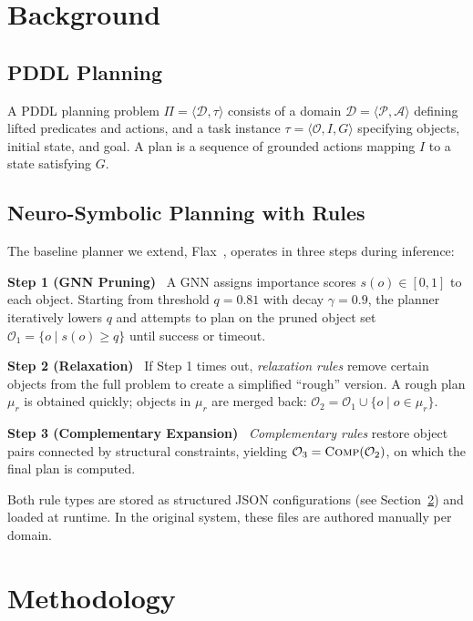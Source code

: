 \documentclass[letterpaper, 10pt, journal, twoside]{IEEEtran}
\newcommand{\sref}[1]{Section~\ref{#1}}
\newcommand{\myparagraph}[1]{\noindent\textbf{#1}~}
\begin{document}
\section{Background}
\label{sec:background}

\subsection{PDDL Planning}
A PDDL planning problem $\Pi = \langle \mathcal{D}, \tau \rangle$ consists of a domain $\mathcal{D} = \langle \mathcal{P}, \mathcal{A} \rangle$ defining lifted predicates and actions, and a task instance $\tau = \langle \mathcal{O}, I, G \rangle$ specifying objects, initial state, and goal.
A plan is a sequence of grounded actions mapping $I$ to a state satisfying $G$.

\subsection{Neuro-Symbolic Planning with Rules}
\label{sec:flax_bg}
The baseline planner we extend, Flax~\cite{du2026fast}, operates in three steps during inference:

\myparagraph{Step 1 (GNN Pruning)}
A GNN assigns importance scores $s(o) \in [0,1]$ to each object. Starting from threshold $q = 0.81$ with decay $\gamma = 0.9$, the planner iteratively lowers $q$ and attempts to plan on the pruned object set $\mathcal{O}_1 = \{o \mid s(o) \geq q\}$ until success or timeout.

\myparagraph{Step 2 (Relaxation)}
If Step 1 times out, \emph{relaxation rules} remove certain objects from the full problem to create a simplified ``rough'' version. A rough plan $\mu_r$ is obtained quickly; objects in $\mu_r$ are merged back: $\mathcal{O}_2 = \mathcal{O}_1 \cup \{o \mid o \in \mu_r\}$.

\myparagraph{Step 3 (Complementary Expansion)}
\emph{Complementary rules} restore object pairs connected by structural constraints, yielding $\mathcal{O}_3 = \textsc{Comp}(\mathcal{O}_2)$, on which the final plan is computed.

Both rule types are stored as structured JSON configurations (see \sref{sec:method}) and loaded at runtime.
In the original system, these files are authored manually per domain.


\section{Methodology}
\label{sec:method}
\end{document}
